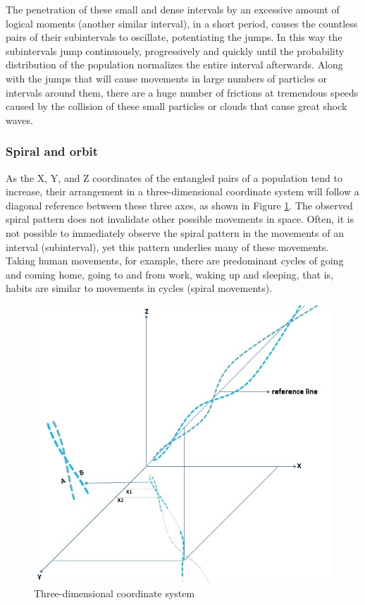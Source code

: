 The penetration of these small and dense intervals by an excessive amount of logical moments (another similar interval), in a short period, causes the countless pairs of their subintervals to oscillate, potentiating the jumps. In this way the subintervals jump continuously, progressively and quickly until the probability distribution of the population normalizes the entire interval afterwards. Along with the jumps that will cause movements in large numbers of particles or intervals around them, there are a huge number of frictions at tremendous speeds caused by the collision of these small particles or clouds that cause great shock waves.

\subsubsection{Spiral and orbit}
As the X, Y, and Z coordinates of the entangled pairs of a population tend to increase, their arrangement in a three-dimensional coordinate system will follow a diagonal reference between these three axes, as shown in Figure \ref{fig:consciousness_space_spiral_reference_line}. The observed spiral pattern does not invalidate other possible movements in space. Often, it is not possible to immediately observe the spiral pattern in the movements of an interval (subinterval), yet this pattern underlies many of these movements.  Taking human movements, for example, there are predominant cycles of going and coming home, going to and from work, waking up and sleeping, that is, habits are similar to movements in cycles (spiral movements).
	\begin{figure}[H]
	\caption{Three-dimensional coordinate system}
	\label{fig:consciousness_space_spiral_reference_line}
	\centering
	\includegraphics[scale=.7]{sections/images/consciousness_space_spiral_reference_line.jpg}
	\end{figure}

